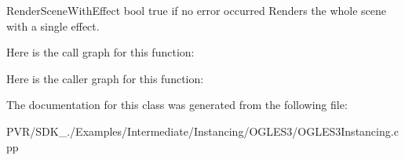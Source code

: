   Render\+Scene\+With\+Effect  bool true if no error occurred  Renders the whole scene with a single effect. 

Here is the call graph for this function\+:




Here is the caller graph for this function\+:




The documentation for this class was generated from the following file\+:\begin{DoxyCompactItemize}
\item 
P\+V\+R/\+S\+D\+K\+\_./\+Examples/\+Intermediate/\+Instancing/\+O\+G\+L\+E\+S3/O\+G\+L\+E\+S3\+Instancing.\+cpp\end{DoxyCompactItemize}
